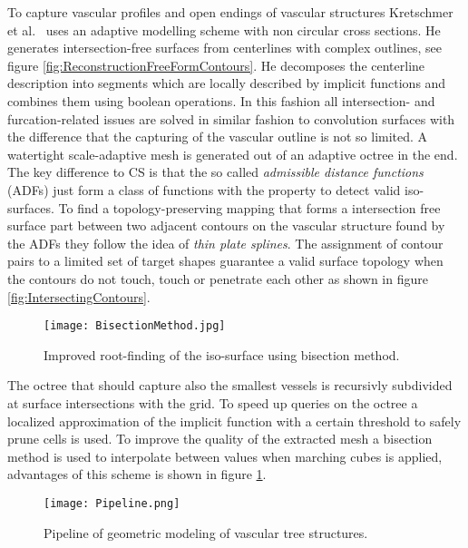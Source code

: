 To capture vascular profiles and open endings of vascular structures Kretschmer et al.~\cite{kretschmer2012reliable} uses an adaptive modelling scheme with non circular cross sections. He generates intersection-free surfaces from centerlines with complex outlines, see figure \ref{fig:ReconstructionFreeFormContours}. He decomposes the centerline description into segments which are locally described by implicit functions and combines them using boolean operations. In this fashion all intersection- and furcation-related issues are solved in similar fashion to convolution surfaces with the difference that the capturing of the vascular outline is not so limited. A watertight scale-adaptive mesh is generated out of an adaptive octree in the end. The key difference to CS is that the so called \emph{admissible distance functions} (ADFs) just form a class of functions with the property to detect valid iso-surfaces. To find a topology-preserving mapping that forms a intersection free surface part between two adjacent contours on the vascular structure found by the ADFs they follow the idea of \emph{thin plate splines}. The assignment of contour pairs to a limited set of target shapes guarantee a valid surface topology when the contours do not touch, touch or penetrate each other as shown in figure \ref{fig:IntersectingContours}.

\begin{figure}[h]
	\centering
	\texttt{[image: BisectionMethod.jpg]} \\
	\caption{Improved root-finding of the iso-surface using bisection method.}
	\cite{kretschmer2012reliable}
	\label{fig:BisectionMethod}
\end{figure} 

The octree that should capture also the smallest vessels is recursivly subdivided at surface intersections with the grid. To speed up queries on the octree a localized approximation of the implicit function with a certain threshold to safely prune cells is used.
To improve the quality of the extracted mesh a bisection method is used to interpolate between values when marching cubes is applied, advantages of this scheme is shown in figure \ref{fig:BisectionMethod}.

\begin{figure}[h]
	\centering
	\texttt{[image: Pipeline.png]} \\
	\caption{Pipeline of geometric modeling of vascular tree structures.}
	\cite{wu2010scale}
	\label{fig:Pipeline}
\end{figure} 

